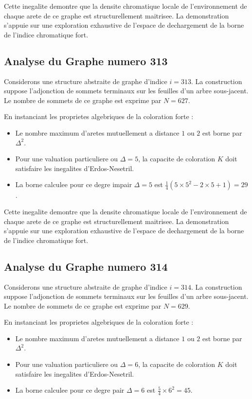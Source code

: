 \documentclass[11pt,a4paper]{article}
\begin{document}
Cette inegalite demontre que la densite chromatique locale de l'environnement de chaque arete de ce graphe est structurellement maitrisee. La demonstration s'appuie sur une exploration exhaustive de l'espace de dechargement de la borne de l'indice chromatique fort.

\subsection{Analyse du Graphe numero 313}
Considerons une structure abstraite de graphe d'indice $i = 313$. La construction suppose l'adjonction de sommets terminaux sur les feuilles d'un arbre sous-jacent. Le nombre de sommets de ce graphe est exprime par $N = 627$.

En instanciant les proprietes algebriques de la coloration forte :
\begin{itemize}
\item Le nombre maximum d'aretes mutuellement a distance $1$ ou $2$ est borne par $\Delta^2$.
\item Pour une valuation particuliere ou $\Delta = 5$, la capacite de coloration $K$ doit satisfaire les inegalites d'Erdos-Nesetril.
\item La borne calculee pour ce degre impair $\Delta = 5$ est $\frac{1}{4}(5 \times 5^2 - 2 \times 5 + 1) = 29$.
\end{itemize}

Cette inegalite demontre que la densite chromatique locale de l'environnement de chaque arete de ce graphe est structurellement maitrisee. La demonstration s'appuie sur une exploration exhaustive de l'espace de dechargement de la borne de l'indice chromatique fort.

\subsection{Analyse du Graphe numero 314}
Considerons une structure abstraite de graphe d'indice $i = 314$. La construction suppose l'adjonction de sommets terminaux sur les feuilles d'un arbre sous-jacent. Le nombre de sommets de ce graphe est exprime par $N = 629$.

En instanciant les proprietes algebriques de la coloration forte :
\begin{itemize}
\item Le nombre maximum d'aretes mutuellement a distance $1$ ou $2$ est borne par $\Delta^2$.
\item Pour une valuation particuliere ou $\Delta = 6$, la capacite de coloration $K$ doit satisfaire les inegalites d'Erdos-Nesetril.
\item La borne calculee pour ce degre pair $\Delta = 6$ est $\frac{5}{4} \times 6^2 = 45$.
\end{itemize}
\end{document}
